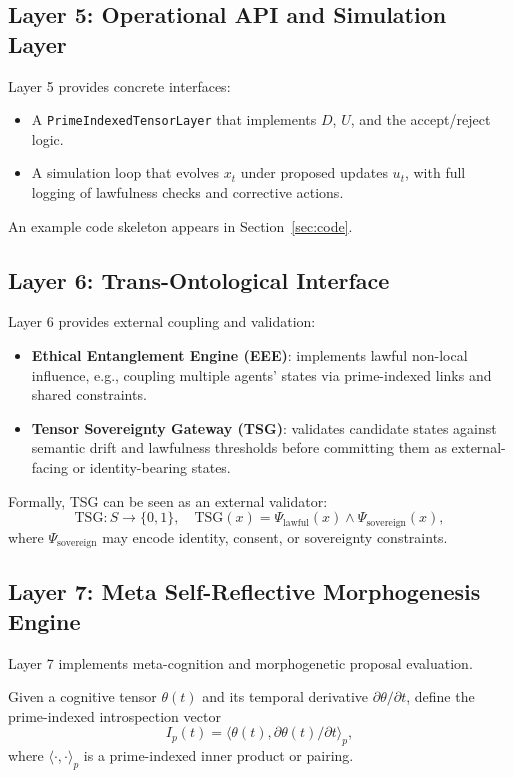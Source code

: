 \documentclass[11pt]{article}
\begin{document}
\subsection{Layer 5: Operational API and Simulation Layer}

Layer 5 provides concrete interfaces:
\begin{itemize}
  \item A \texttt{PrimeIndexedTensorLayer} that implements \(D\), \(U\), and the accept/reject logic.
  \item A simulation loop that evolves \(x_t\) under proposed updates \(u_t\), with full logging of lawfulness checks and corrective actions.
\end{itemize}

An example code skeleton appears in Section~\ref{sec:code}.

\subsection{Layer 6: Trans-Ontological Interface}

Layer 6 provides external coupling and validation:

\begin{itemize}
  \item \textbf{Ethical Entanglement Engine (EEE)}: implements lawful non-local influence, e.g., coupling multiple agents' states via prime-indexed links and shared constraints.
  \item \textbf{Tensor Sovereignty Gateway (TSG)}: validates candidate states against semantic drift and lawfulness thresholds before committing them as external-facing or identity-bearing states.
\end{itemize}

Formally, TSG can be seen as an external validator:
\[
  \mathrm{TSG} : S \to \{0,1\}, \quad \mathrm{TSG}(x) = \Psi_{\mathrm{lawful}}(x) \wedge \Psi_{\mathrm{sovereign}}(x),
\]
where \(\Psi_{\mathrm{sovereign}}\) may encode identity, consent, or sovereignty constraints.

\subsection{Layer 7: Meta Self-Reflective Morphogenesis Engine}

Layer 7 implements meta-cognition and morphogenetic proposal evaluation.

\begin{definition}
Given a cognitive tensor \(\theta(t)\) and its temporal derivative \(\partial\theta/\partial t\), define the prime-indexed introspection vector
\[
  I_p(t) = \langle \theta(t), \partial\theta(t)/\partial t \rangle_p,
\]
where \(\langle \cdot, \cdot \rangle_p\) is a prime-indexed inner product or pairing.
\end{definition}
\end{document}
